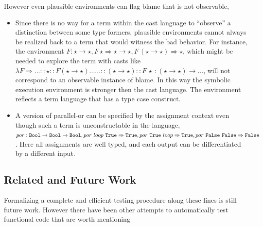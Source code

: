  However even plausible environments can flag blame that is not observable,
 \begin{itemize}
 \item
 Since there is no way for a term within the cast language to ``observe'' a distinction between some type formers, plausible environments cannot always be realized back to a term that would witness the bad behavior.
 For instance, the environment $F:\star\rightarrow\star,F\,\star \Rightarrow \star\rightarrow\star,F\,\left(\star\rightarrow\star\right) \Rightarrow \star$, which might be needed to explore the term with casts like
  $\lambda F\Rightarrow...::\star::F\left(\star\rightarrow\star\right)......::\left(\star\rightarrow\star\right)::F\,\star\ :\left(\star\rightarrow\star\right)\rightarrow...$,
  will not correspond to an observable instance of blame.
 In this way the symbolic execution environment is stronger then the cast language.
 The environment reflects a term language that has a type case construct.
 \item
 A version of parallel-or can be specified by the assignment context even though such a term is unconstructable in the language, $por:\Bool{}\rightarrow\Bool{}\rightarrow\Bool{},por\ loop\ \True{} \Rightarrow  \True{}, por\ \True{} \ loop \Rightarrow \True{},por\ \False{}\ \False{} \Rightarrow  \False{}$.
 Here all assignments are well typed, and each output can be differentiated by a different input.
\end{itemize}
  
\subsection{Related and Future Work}
 
Formalizing a complete and efficient testing procedure along these lines is still future work.
However there have been other attempts to automatically test functional code that are worth mentioning
 
